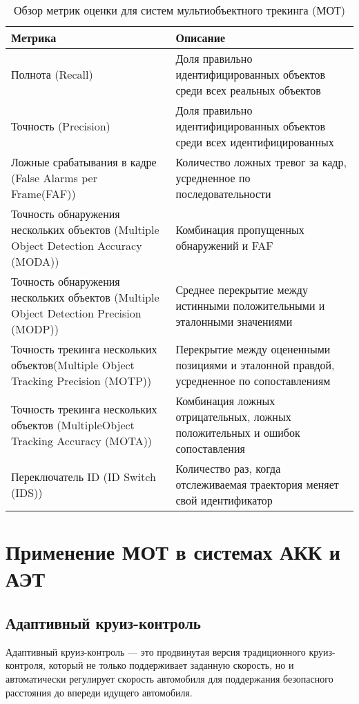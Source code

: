 \begin{table}[H]
	\centering
	\caption{Обзор метрик оценки для систем мультиобъектного трекинга (МОТ)}
	\label{metrics}
	\begin{tabularx}{\textwidth}{|X|X|}
		\hline
		Метрика & Описание\\ 
		\hline
		Полнота (Recall) & Доля правильно идентифицированных объектов среди всех реальных объектов \\
		\hline
		Точность (Precision) & Доля правильно идентифицированных объектов среди всех идентифицированных\\
		\hline
		Ложные срабатывания в кадре (False Alarms per Frame(FAF)) & Количество ложных тревог за кадр, усредненное по последовательности \\
		\hline
		Точность обнаружения нескольких объектов (Multiple Object Detection Accuracy (MODA)) & Комбинация пропущенных обнаружений и FAF \\
		\hline
		Точность обнаружения нескольких объектов (Multiple Object Detection Precision (MODP)) & Среднее перекрытие между истинными положительными и эталонными значениями \\
		\hline
		Точность трекинга нескольких объектов(Multiple Object Tracking Precision (MOTP)) & 
		Перекрытие между оцененными позициями и эталонной правдой, усредненное по сопоставлениям  \\ 
		\hline
		Точность трекинга нескольких объектов (MultipleObject Tracking Accuracy (MOTA)) & Комбинация ложных отрицательных, ложных положительных и ошибок сопоставления \\
		\hline
		Переключатель ID (ID Switch (IDS)) & Количество раз, когда отслеживаемая траектория меняет свой идентификатор \\
		\hline
	\end{tabularx}
\end{table}


\chapter{Применение МОТ в системах АКК и АЭТ}

\section{Адаптивный круиз-контроль}
Адаптивный круиз-контроль --- это продвинутая версия традиционного круиз-контроля, который не только поддерживает заданную скорость, но и автоматически регулирует скорость автомобиля для поддержания безопасного расстояния до впереди идущего автомобиля.

